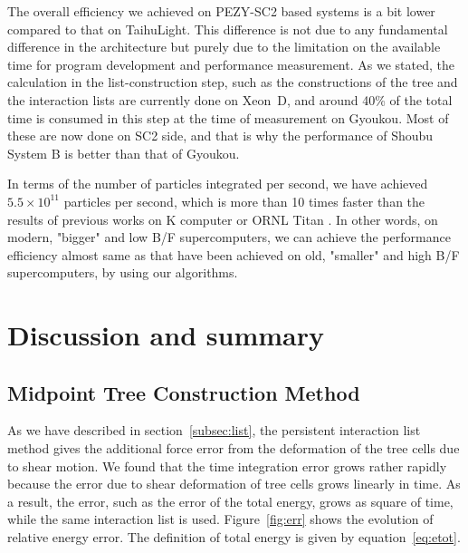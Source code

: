 \documentclass[Afour,sageh,times]{sagej}
\newcommand{\rev}[1]{{#1}}
\begin{document}
The overall efficiency we achieved on PEZY-SC2 based systems is a bit
lower compared to that on TaihuLight. This difference is not due to
any fundamental difference in the architecture but purely due to the
limitation on the available time for program development and
performance measurement. As we stated, the calculation in the
list-construction step, such as the constructions of the tree and the
interaction lists are currently done on Xeon~D, and around 40\% of the
total time is consumed in this step at the time of measurement on
Gyoukou. Most of these are now done on SC2 side, and that is why the
performance of Shoubu System B is better than that of Gyoukou.

In terms of the number of particles integrated per second, we have
achieved $5.5\times 10^{11}$ particles per second, which is more than
10 times faster than the results of previous works on K computer
\citep{Ishiyamaetal2012} or ORNL Titan \citep{Bedorfetal2014}.
\rev{In other words, on modern, "bigger" and low B/F supercomputers,
  we can achieve the performance efficiency almost same as that have
  been achieved on old, "smaller" and high B/F supercomputers, by
  using our algorithms.}










\section{Discussion and summary}
\label{sect:summary}
\rev{
  \subsection{Midpoint Tree Construction Method}
  \label{sec:MT}
  As we have described in section~\ref{subsec:list}, the persistent
  interaction list method gives the additional force error from the
  deformation of the tree cells due to shear motion. We found that the
  time integration error grows rather rapidly because the error due to
  shear deformation of tree cells grows linearly in time. As a result,
  the error, such as the error of the total energy, grows as square of
  time, while the same interaction list is used. Figure~\ref{fig:err}
  shows the evolution of relative energy error. The definition of
  total energy is given by equation~\ref{eq:etot}.  }
\end{document}
